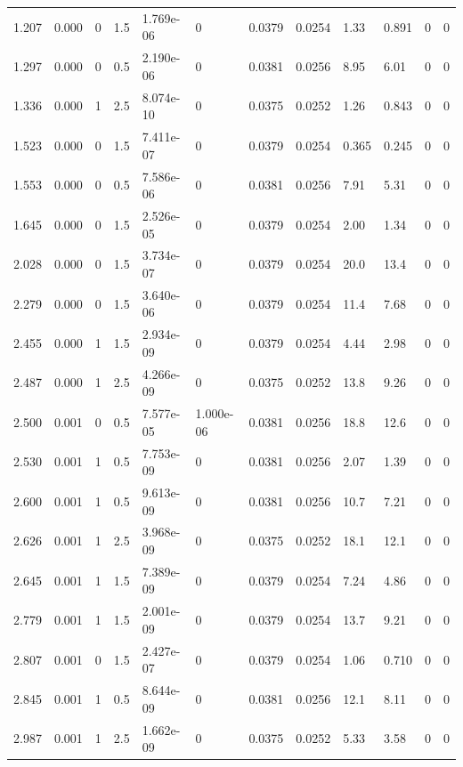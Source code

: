 \documentclass[preview]{standalone}
\begin{document}
{{\begin{tabular}{L{1.2cm}C{1.2cm} C{0.3cm}C{0.5cm} C{1.4cm}C{1.4cm} C{1.4cm}C{1.4cm} C{1.6cm}C{1.6cm} C{1.6cm}C{1.6cm}}
  1.207  &  0.000  & 0     & 1.5 &  1.769e-06  & 0  &  0.0379&   0.0254& 1.33 & 0.891   &  0 & 0  \\ 
  1.297  &  0.000  & 0     & 0.5 &  2.190e-06  & 0  &  0.0381&   0.0256& 8.95 & 6.01   &  0 & 0  \\ 
  1.336  &  0.000  & 1     & 2.5 &  8.074e-10  & 0  &  0.0375&   0.0252& 1.26 & 0.843   &  0 & 0  \\ 
  1.523  &  0.000  & 0     & 1.5 &  7.411e-07  & 0  &  0.0379&   0.0254& 0.365 & 0.245   &  0 & 0  \\ 
  1.553  &  0.000  & 0     & 0.5 &  7.586e-06  & 0  &  0.0381&   0.0256& 7.91 & 5.31   &  0 & 0  \\ 
  1.645  &  0.000  & 0     & 1.5 &  2.526e-05  & 0  &  0.0379&   0.0254& 2.00 & 1.34   &  0 & 0  \\ 
  2.028  &  0.000  & 0     & 1.5 &  3.734e-07  & 0  &  0.0379&   0.0254& 20.0 & 13.4   &  0 & 0  \\ 
  2.279  &  0.000  & 0     & 1.5 &  3.640e-06  & 0  &  0.0379&   0.0254& 11.4 & 7.68   &  0 & 0  \\ 
  2.455  &  0.000  & 1     & 1.5 &  2.934e-09  & 0  &  0.0379&   0.0254& 4.44 & 2.98   &  0 & 0  \\ 
  2.487  &  0.000  & 1     & 2.5 &  4.266e-09  & 0  &  0.0375&   0.0252& 13.8 & 9.26   &  0 & 0  \\ 
  2.500  &  0.001  & 0     & 0.5 &  7.577e-05  & 1.000e-06  &  0.0381&   0.0256& 18.8 & 12.6   &  0 & 0  \\ 
  2.530  &  0.001  & 1     & 0.5 &  7.753e-09  & 0  &  0.0381&   0.0256& 2.07 & 1.39   &  0 & 0  \\ 
  2.600  &  0.001  & 1     & 0.5 &  9.613e-09  & 0  &  0.0381&   0.0256& 10.7 & 7.21   &  0 & 0  \\ 
  2.626  &  0.001  & 1     & 2.5 &  3.968e-09  & 0  &  0.0375&   0.0252& 18.1 & 12.1   &  0 & 0  \\ 
  2.645  &  0.001  & 1     & 1.5 &  7.389e-09  & 0  &  0.0379&   0.0254& 7.24 & 4.86   &  0 & 0  \\ 
  2.779  &  0.001  & 1     & 1.5 &  2.001e-09  & 0  &  0.0379&   0.0254& 13.7 & 9.21   &  0 & 0  \\ 
  2.807  &  0.001  & 0     & 1.5 &  2.427e-07  & 0  &  0.0379&   0.0254& 1.06 & 0.710   &  0 & 0  \\ 
  2.845  &  0.001  & 1     & 0.5 &  8.644e-09  & 0  &  0.0381&   0.0256& 12.1 & 8.11   &  0 & 0  \\ 
  2.987  &  0.001  & 1     & 2.5 &  1.662e-09  & 0  &  0.0375&   0.0252& 5.33 & 3.58   &  0 & 0  \\ 

\end{tabular}}}
\end{document}
